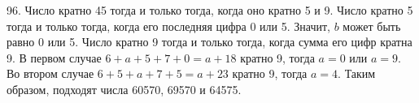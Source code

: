 96. Число кратно 45 тогда и только тогда, когда оно кратно 5 и 9. Число кратно 5 тогда и только тогда, когда его последняя цифра 0 или 5. Значит, $b$ может быть равно 0 или 5. Число кратно 9 тогда и только тогда, когда сумма его цифр кратна 9. В первом случае $6+a+5+7+0=a+18$ кратно 9, тогда $a=0$ или $a=9.$ Во втором случае $6+5+a+7+5=a+23$ кратно 9, тогда $a=4.$ Таким образом, подходят числа 60570, 69570 и 64575.\\

